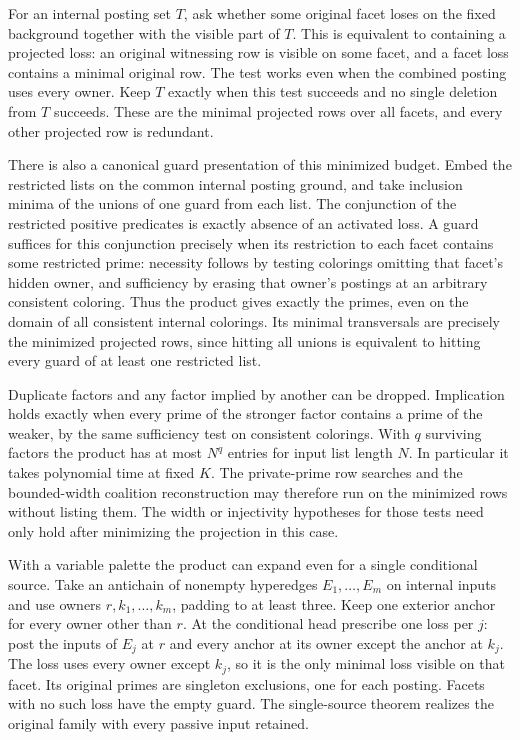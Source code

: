 For an internal posting set $T$, ask whether some
original facet loses on the fixed background together
with the visible part of $T$. This is equivalent to
containing a projected loss: an original witnessing
row is visible on some facet, and a facet loss
contains a minimal original row. The test works
even when the combined posting uses every owner.
Keep $T$ exactly when this test succeeds and no
single deletion from $T$ succeeds. These are the
minimal projected rows over all facets, and every
other projected row is redundant.

There is also a canonical guard presentation of this
minimized budget. Embed the restricted lists on the
common internal posting ground, and take inclusion
minima of the unions of one guard from each list.
The conjunction of the restricted positive predicates
is exactly absence of an activated loss. A guard
suffices for this conjunction precisely when its
restriction to each facet contains some restricted
prime: necessity follows by testing colorings
omitting that facet's hidden owner, and sufficiency
by erasing that owner's postings at an arbitrary
consistent coloring. Thus the product gives exactly
the primes, even on the domain of all consistent
internal colorings. Its minimal transversals are
precisely the minimized projected rows, since
hitting all unions is equivalent to hitting every
guard of at least one restricted list.

Duplicate factors and any factor implied by another
can be dropped. Implication holds exactly when every
prime of the stronger factor contains a prime of the
weaker, by the same sufficiency test on consistent
colorings. With $q$ surviving factors the product
has at most $N^q$ entries for input list length $N$.
In particular it takes polynomial time at fixed $K$.
The private-prime row searches and the bounded-width
coalition reconstruction may therefore run on the
minimized rows without listing them. The width or
injectivity hypotheses for those tests need only hold
after minimizing the projection in this case.

With a variable palette the product can expand even
for a single conditional source. Take an antichain
of nonempty hyperedges $E_1,\ldots,E_m$ on internal
inputs and use owners $r,k_1,\ldots,k_m$, padding
to at least three. Keep one exterior anchor for
every owner other than $r$. At the conditional
head prescribe one loss per $j$: post the inputs
of $E_j$ at $r$ and every anchor at its owner
except the anchor at $k_j$. The loss uses every
owner except $k_j$, so it is the only minimal
loss visible on that facet. Its original primes
are singleton exclusions, one for each posting.
Facets with no such loss have the empty guard.
The single-source theorem realizes the original
family with every passive input retained.

